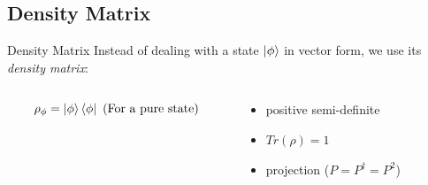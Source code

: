 \documentclass[11pt,svgnames,smaller,aspectratio=43,english]{beamer}
\begin{document}
\subsection{Density Matrix}
\begin{frame}{Density Matrix}
	Instead of dealing with a state $\ket{\phi}$ in vector form, we use its \emph{density matrix}:

	\begin{columns}
		\begin{column}[T]{0.35\textwidth}
			\begin{equation*}
				\rho_\phi = \ket{\phi}\bra{\phi} \text{ (For a pure state)}		
			\end{equation*}
		\end{column}
		\begin{column}[T]{0.5\textwidth}
			\begin{itemize}
				\item positive semi-definite
				\item $Tr(\rho) = 1$
				\item projection ($P = P^\dagger = P^2$)
			\end{itemize}
		\end{column}
	\end{columns}

	\vspace*{1em}

	\uncover<+->{}
	
\end{frame}
\end{document}
